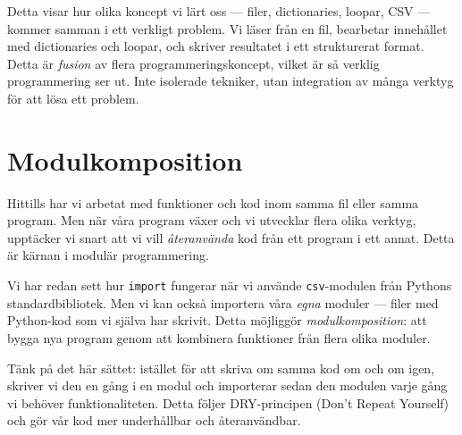
Detta visar hur olika koncept vi lärt oss --- filer, dictionaries, loopar, CSV --- kommer samman i ett verkligt problem. Vi läser från en fil, bearbetar innehållet med dictionaries och loopar, och skriver resultatet i ett strukturerat format. Detta är \emph{fusion} av flera programmeringskoncept, vilket är så verklig programmering ser ut. Inte isolerade tekniker, utan integration av många verktyg för att lösa ett problem.


\section{Modulkomposition}

Hittills har vi arbetat med funktioner och kod inom samma fil eller samma program. Men när våra program växer och vi utvecklar flera olika verktyg, upptäcker vi snart att vi vill \emph{återanvända} kod från ett program i ett annat. Detta är kärnan i modulär programmering.

Vi har redan sett hur \texttt{import} fungerar när vi använde \texttt{csv}-modulen från Pythons standardbibliotek. Men vi kan också importera våra \emph{egna} moduler --- filer med Python-kod som vi själva har skrivit. Detta möjliggör \emph{modulkomposition}: att bygga nya program genom att kombinera funktioner från flera olika moduler.

Tänk på det här sättet: istället för att skriva om samma kod om och om igen, skriver vi den en gång i en modul och importerar sedan den modulen varje gång vi behöver funktionaliteten. Detta följer DRY-principen (\foreignlanguage{english}{Don't Repeat Yourself}) och gör vår kod mer underhållbar och återanvändbar.

